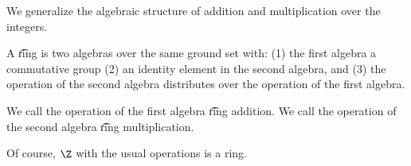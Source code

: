 

We generalize the algebraic structure of addition and multiplication over the integers.


A \t{ring} is two algebras over the same ground set with:
(1) the first algebra a commutative group
(2) an identity element in the second algebra,
and
(3) the operation of the second algebra
distributes over the operation of the first
algebra.

We call the operation of the first algebra
\t{ring addition}.
We call the operation of the second algebra
\t{ring multiplication}.


Of course, $\Z$ with the usual operations is a ring.
